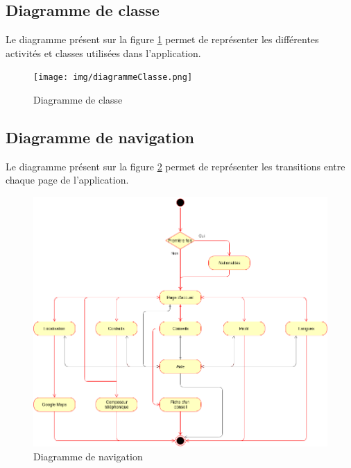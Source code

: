 \subsection{Diagramme de classe}

	Le diagramme présent sur la figure \ref{diagrammeClasse} permet de représenter les différentes activités et classes utilisées dans l'application.
	
\begin{figure}
	\texttt{[image: img/diagrammeClasse.png]}
	\caption{Diagramme de classe}
	\label{diagrammeClasse}
\end{figure}

\subsection{Diagramme de navigation}

	Le diagramme présent sur la figure \ref{diagrammeNavigation} permet de représenter les transitions entre chaque page de l'application. 
	
	\begin{figure}[!h]
		\begin{center}	
	   		\includegraphics[scale=0.6]{img/navigation.png}
	   		\caption{Diagramme de navigation}
	   		\label{diagrammeNavigation} 	
		\end{center}
	\end{figure}

\newpage